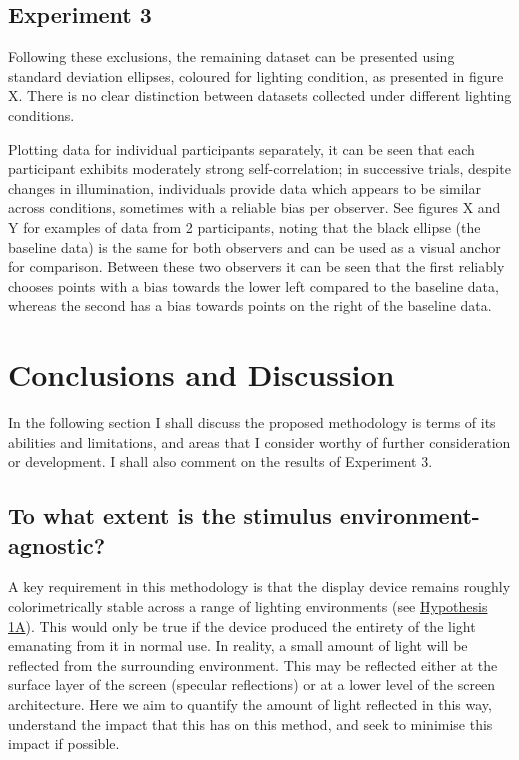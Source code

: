 \subsection{Experiment 3}

Following these exclusions, the remaining dataset can be presented using standard deviation ellipses, coloured for lighting condition, as presented in figure X. There is no clear distinction between datasets collected under different lighting conditions.


Plotting data for individual participants separately, it can be seen that each participant exhibits moderately strong self-correlation; in successive trials, despite changes in illumination, individuals provide data which appears to be similar across conditions, sometimes with a reliable bias per observer. See figures X and Y for examples of data from 2 participants, noting that the black ellipse (the baseline data) is the same for both observers and can be used as a visual anchor for comparison. Between these two observers it can be seen that the first reliably chooses points with a bias towards the lower left compared to the baseline data, whereas the second has a bias towards points on the right of the baseline data. 



\section{Conclusions and Discussion}

In the following section I shall discuss the proposed methodology is terms of its abilities and limitations, and areas that I consider worthy of further consideration or development. I shall also comment on the results of Experiment 3.

\subsection{To what extent is the stimulus environment-agnostic?}

A key requirement in this methodology is that the display device remains roughly colorimetrically stable across a range of lighting environments (see \hyperref[list:hyp1a]{Hypothesis 1A}). This would only be true if the device produced the entirety of the light emanating from it in normal use. In reality, a small amount of light will be reflected from the surrounding environment. This may be reflected either at the surface layer of the screen (specular reflections) or at a lower level of the screen architecture. Here we aim to quantify the amount of light reflected in this way, understand the impact that this has on this method, and seek to minimise this impact if possible.

